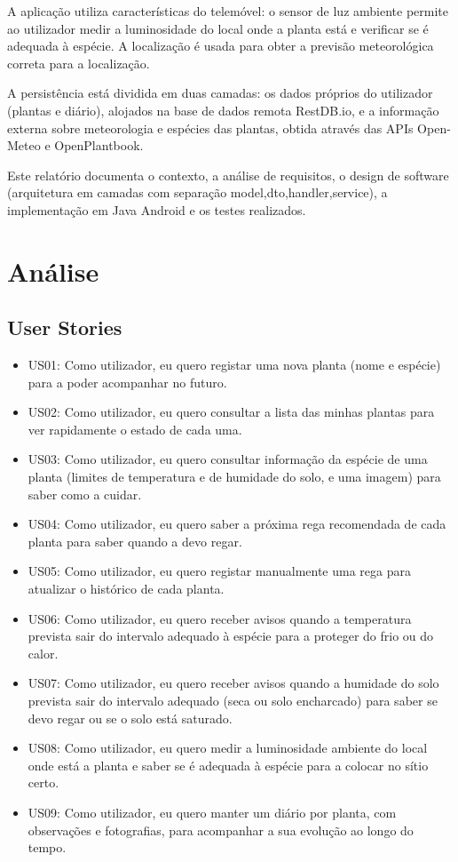\documentclass[runningheads,a4paper]{llncs}
\begin{document}
A aplicação utiliza características do telemóvel: o sensor de luz ambiente permite
ao utilizador medir a luminosidade do local onde a planta está e verificar se é
adequada à espécie. A localização é usada para obter a previsão
meteorológica correta para a localização.

A persistência está dividida em duas camadas: os dados próprios do utilizador
(plantas e diário), alojados na base de dados remota RestDB.io, e a informação
externa sobre meteorologia e espécies das plantas, obtida através das APIs
Open-Meteo e OpenPlantbook.

Este relatório documenta o contexto, a análise de requisitos, o design de software
(arquitetura em camadas com separação model,dto,handler,service), a implementação
em Java Android e os testes realizados.

\section{Análise}

\subsection{User Stories}

\begin{itemize}
    \item US01: Como utilizador, eu quero registar uma nova planta (nome
        e espécie) para a poder acompanhar no futuro.
    \item US02: Como utilizador, eu quero consultar a lista das minhas
        plantas para ver rapidamente o estado de cada uma.
    \item US03: Como utilizador, eu quero consultar informação da espécie
        de uma planta (limites de temperatura e de humidade do solo, e uma imagem)
        para saber como a cuidar.
    \item US04: Como utilizador, eu quero saber a próxima rega recomendada
        de cada planta para saber quando a devo regar.
    \item US05: Como utilizador, eu quero registar manualmente uma rega
        para atualizar o histórico de cada planta.
    \item US06: Como utilizador, eu quero receber avisos quando a
        temperatura prevista sair do intervalo adequado à espécie para a proteger
        do frio ou do calor.
    \item US07: Como utilizador, eu quero receber avisos quando a humidade
        do solo prevista sair do intervalo adequado (seca ou solo encharcado) para
        saber se devo regar ou se o solo está saturado.
    \item US08: Como utilizador, eu quero medir a luminosidade ambiente do
        local onde está a planta e saber se é adequada à espécie para a colocar no
        sítio certo.
    \item US09: Como utilizador, eu quero manter um diário por planta, com
        observações e fotografias, para acompanhar a sua evolução ao longo do tempo.
\end{itemize}
\end{document}
